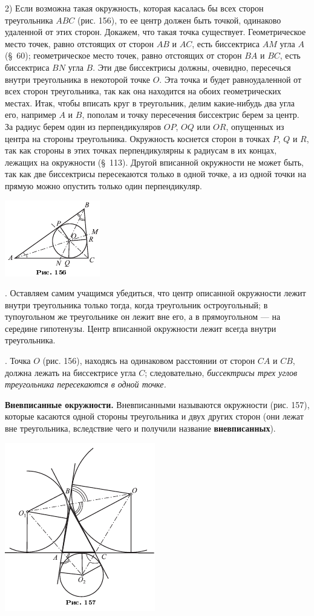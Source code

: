 \documentclass[oneside]{book}
\begin{document}
2) Если возможна такая окружность, которая касалась бы всех сторон треугольника $ABC$ (рис. 156),
то ее центр должен быть точкой, одинаково удаленной от этих сторон.
Докажем, что такая точка существует.
Геометрическое место точек, равно отстоящих от сторон $AB$ и $AC$, есть биссектриса $AM$ угла $A$ (§~60);
геометрическое место точек, равно отстоящих от сторон $BA$ и $BC$, есть биссектриса $BN$ угла $B$.
Эти две биссектрисы должны, очевидно, пересечься внутри треугольника в некоторой точке $O$.
Эта точка и будет равноудаленной от всех сторон треугольника, так как она находится на обоих геометрических местах.
Итак, чтобы вписать круг в треугольник, делим какие-нибудь два угла его, например $A$ и $B$, пополам и точку пересечения биссектрис берем за центр.
За радиус берем один из перпендикуляров $OP$, $OQ$ или $OR$, опущенных из центра на стороны треугольника.
Окружность коснется сторон в точках $P$, $Q$ и $R$, так как стороны в этих точках перпендикулярны к радиусам в их концах, лежащих на окружности (§~113).
Другой вписанной окружности не может быть, так как две биссектрисы пересекаются только в одной точке, а из одной точки на прямую можно опустить только один перпендикуляр.

\includegraphics{pics/ris-156}

.
Оставляем самим учащимся убедиться, что центр описанной окружности лежит внутри треугольника только тогда, когда треугольник остроугольный;
в тупоугольном же треугольнике он лежит вне его, а в прямоугольном — на середине гипотенузы.
Центр вписанной окружности лежит всегда внутри треугольника.

.
Точка $O$ (рис. 156), находясь на одинаковом расстоянии от сторон $CA$ и $CB$, должна лежать на биссектрисе угла $C$;
следовательно, \emph{биссектрисы трех углов треугольника пересекаются в одной точке.}

\textbf{Вневписанные окружности.}
Вневписанными называются окружности (рис. 157), которые касаются одной стороны треугольника и  двух других сторон (они лежат вне треугольника, вследствие чего и получили название \textbf{вневписанных}).

\includegraphics{pics/ris-157}
\end{document}
